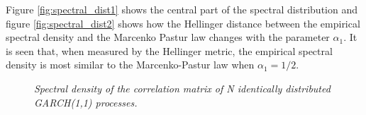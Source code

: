 \documentclass{article}
\begin{document}
Figure \ref{fig:spectral_dist1} shows the central part of the spectral
distribution and figure \ref{fig:spectral_dist2} shows how the
Hellinger distance between the empirical spectral density and the
Marcenko Pastur law changes with the parameter $\alpha_1$.
It is seen that, when measured by the Hellinger metric, the empirical
spectral density is most similar to the Marcenko-Pastur law when
$\alpha_1 = 1/2$.
\begin{figure}[htb!]
  \centering
  \hspace{5mm}
  \caption{\small \it Spectral density of the
    correlation matrix of N identically distributed GARCH(1,1)
    processes.}
  \label{fig:spectral_dist}
\end{figure}
\end{document}
